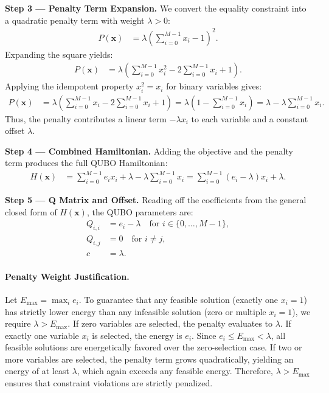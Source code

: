 \documentclass[12pt]{article}
\begin{document}
\textbf{Step 3 --- Penalty Term Expansion.} We convert the equality constraint into a quadratic penalty term with weight $\lambda > 0$:
\begin{align}
P(\mathbf{x}) &= \lambda \left( \sum_{i=0}^{M-1} x_i - 1 \right)^2.
\end{align}
Expanding the square yields:
\begin{align}
P(\mathbf{x}) &= \lambda \left( \sum_{i=0}^{M-1} x_i^2 - 2\sum_{i=0}^{M-1} x_i + 1 \right).
\end{align}
Applying the idempotent property $x_i^2 = x_i$ for binary variables gives:
\begin{align}
P(\mathbf{x}) &= \lambda \left( \sum_{i=0}^{M-1} x_i - 2\sum_{i=0}^{M-1} x_i + 1 \right) = \lambda \left( 1 - \sum_{i=0}^{M-1} x_i \right) = \lambda - \lambda \sum_{i=0}^{M-1} x_i.
\end{align}
Thus, the penalty contributes a linear term $-\lambda x_i$ to each variable and a constant offset $\lambda$.

\textbf{Step 4 --- Combined Hamiltonian.} Adding the objective and the penalty term produces the full QUBO Hamiltonian:
\begin{align}
H(\mathbf{x}) &= \sum_{i=0}^{M-1} e_i x_i + \lambda - \lambda \sum_{i=0}^{M-1} x_i = \sum_{i=0}^{M-1} (e_i - \lambda) x_i + \lambda.
\end{align}

\textbf{Step 5 --- Q Matrix and Offset.} Reading off the coefficients from the general closed form of $H(\mathbf{x})$, the QUBO parameters are:
\begin{align}
Q_{i,i} &= e_i - \lambda \quad \text{for } i \in \{0, \dots, M-1\}, \\
Q_{i,j} &= 0 \quad \text{for } i \neq j, \\
c &= \lambda.
\end{align}

\paragraph{Penalty Weight Justification.}
Let $E_{\max} = \max_{i} e_i$. To guarantee that any feasible solution (exactly one $x_i=1$) has strictly lower energy than any infeasible solution (zero or multiple $x_i=1$), we require $\lambda > E_{\max}$. If zero variables are selected, the penalty evaluates to $\lambda$. If exactly one variable $x_i$ is selected, the energy is $e_i$. Since $e_i \le E_{\max} < \lambda$, all feasible solutions are energetically favored over the zero-selection case. If two or more variables are selected, the penalty term grows quadratically, yielding an energy of at least $\lambda$, which again exceeds any feasible energy. Therefore, $\lambda > E_{\max}$ ensures that constraint violations are strictly penalized.
\end{document}
